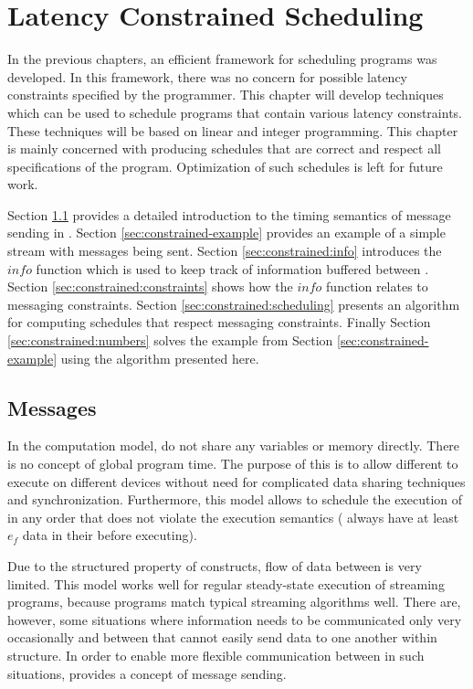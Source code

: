 \section{Latency Constrained Scheduling}
\label{chpt:constrained}

In the previous chapters, an efficient framework for scheduling
{\StreamIt} programs was developed.  In this framework, there was no
concern for possible latency constraints specified by the
programmer. This chapter will develop techniques which can be used
to schedule {\StreamIt} programs that contain various latency
constraints. These techniques will be based on linear and integer
programming. This chapter is mainly concerned with producing
schedules that are correct and respect all specifications of the
program. Optimization of such schedules is left for future work.

Section \ref{sec:constrained:intro} provides a detailed
introduction to the timing semantics of message sending in
{\StreamIt}. Section \ref{sec:constrained-example} provides an
example of a simple stream with messages being sent. Section
\ref{sec:constrained:info} introduces the $info$ function which is
used to keep track of information buffered between {\filters}.
Section \ref{sec:constrained:constraints} shows how the $info$
function relates to messaging constraints. Section
\ref{sec:constrained:scheduling} presents an algorithm for
computing schedules that respect messaging constraints. Finally
Section \ref{sec:constrained:numbers} solves the example from
Section \ref{sec:constrained-example} using the algorithm
presented here.

\subsection{Messages}
\label{sec:constrained:intro}

In the {\StreamIt} computation model, {\filters} do not share any
variables or memory directly.  There is no concept of global
program time.  The purpose of this is to allow different {\filters}
to execute on different devices without need for complicated data
sharing techniques and synchronization. Furthermore, this model
allows to schedule the execution of {\filters} in any order that
does not violate the execution semantics ({\filters} always have at
least $e_f$ data in their {\Input} {{\Channel}} before executing).

Due to the structured property of {\StreamIt} constructs, flow of
data between {\filters} is very limited. This model works well for
regular steady-state execution of streaming programs, because
{\StreamIt} programs match typical streaming algorithms well.  There
are, however, some situations where information needs to be
communicated only very occasionally and between {\filters} that
cannot easily send data to one another within {\StreamIt} structure.
In order to enable more flexible communication between {\filters} in
such situations, {\StreamIt} provides a concept of message sending.


